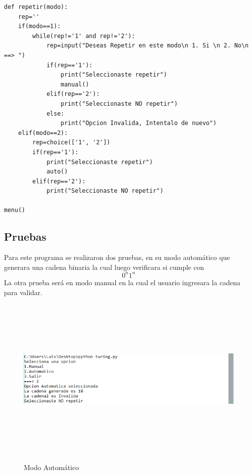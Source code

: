 \documentclass[12pt]{article}
\begin{document}
\begin{lstlisting}[frame=single]
def repetir(modo):
	rep=''
	if(modo==1):
		while(rep!='1' and rep!='2'):
			rep=input("Deseas Repetir en este modo\n 1. Si \n 2. No\n ==> ")
			if(rep=='1'):
				print("Seleccionaste repetir")
				manual()
			elif(rep=='2'):
				print("Seleccionaste NO repetir")
			else:
				print("Opcion Invalida, Intentalo de nuevo")
	elif(modo==2):
		rep=choice(['1', '2'])
		if(rep=='1'):
			print("Seleccionaste repetir")
			auto()
		elif(rep=='2'):
			print("Seleccionaste NO repetir")

menu()

\end{lstlisting}

\subsection{Pruebas}

Para este programa se realizaron dos pruebas, en su modo automático que generara una cadena binaria la cual luego verificara si cumple con \[0^{n}1^{n}\] La otra prueba será en modo manual en la cual el usuario ingresara la cadena para validar. 

\begin{figure}[H]
\begin{center}
\includegraphics[width=\textwidth, height=8cm]{auto_turing}
\label{ }
\caption{Modo Automático}
\end{center}
\end{figure}
\end{document}

